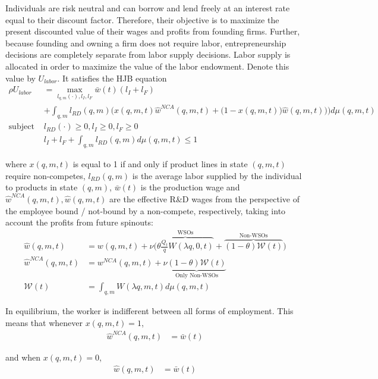 \documentclass[12pt,english]{article}
\theoremstyle{remark}
\begin{document}
Individuals are risk neutral and can borrow and lend freely at an interest rate equal to their discount factor. Therefore, their objective is to maximize the present discounted value of their wages and profits from founding firms. Further, because founding and owning a firm does not require labor, entrepreneurship decisions are completely separate from labor supply decisions. Labor supply is allocated in order to maximize the value of the labor endowment. Denote this value by $U_{labor}$. It satisfies the HJB equation
\begin{align}
	\rho U_{labor} &= \max_{l_{q,m}(\cdot),l_I,l_F} \bar{w}(t) (l_I + l_F) \nonumber\\
	&+ \int_{q,m} l_{RD} (q,m) \Bigg(x(q,m,t) \hat{w}^{NCA}(q,m,t) + \Big(1-x(q,m,t) \Big)\hat{w}(q,m,t))  \Bigg) d\mu(q,m,t) \nonumber  \\
	\textrm{subject to: }  & l_{RD}(\cdot) \ge 0, l_I \ge 0, l_F \ge 0  \nonumber \\
	& l_I + l_F + \int_{q,m} l_{RD}(q,m) d\mu(q,m,t) \le 1 
\end{align}

where $x(q,m,t)$ is equal to 1 if and only if product lines in state $(q,m,t)$ require non-competes, $l_{RD}(q,m)$ is the average labor supplied by the individual to products in state $(q,m)$,  $\bar{w}(t)$ is the production wage and $\hat{w}^{NCA}(q,m,t),\hat{w}(q,m,t)$ are the effective R\&D wages from the perspective of the employee bound / not-bound by a non-compete, respectively, taking into account the profits from future spinouts: 
\begin{align}
	\hat{w}(q,m,t) &=  w(q,m,t) + \nu \Big( \overbrace{\theta \frac{Q_t}{q} W(\lambda q,0,t)}^{\textrm{WSOs}} + \overbrace{(1-\theta) \mathcal{W}(t)}^{\textrm{Non-WSOs}} \Big) \label{worker_effective_wage}\\
	\hat{w}^{NCA}(q,m,t) &= w^{NCA}(q,m,t) + \nu \underbrace{(1-\theta) \mathcal{W}(t)}_{\textrm{Only Non-WSOs}} \label{worker_effective_wage_NCA}\\ 
	\mathcal{W}(t) &= \int_{q,m} W(\lambda q,m,t) d\mu(q,m,t)
\end{align}

In equilibrium, the worker is indifferent between all forms of employment. This means that whenever $x(q,m,t) = 1$, 
\begin{align}
\hat{w}^{NCA}(q,m,t) &= \bar{w}(t) \label{wage_rd_NCA}
\end{align}

and when $x(q,m,t) = 0$, 
\begin{align}
\hat{w}(q,m,t) &= \bar{w}(t) \label{wage_rd}
\end{align}
\end{document}
